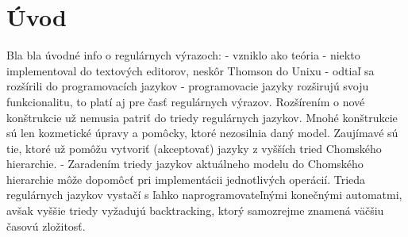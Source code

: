 {}
{}
\chapter*{Úvod}\label{chap:intro}

Bla bla úvodné info o regulárnych výrazoch:
- vzniklo ako teória
- niekto implementoval do textových editorov, neskôr Thomson do Unixu
- odtiaľ sa rozšírili do programovacích jazykov
- programovacie jazyky rozširujú svoju funkcionalitu, to platí aj pre časť regulárnych výrazov. Rozšírením o nové konštrukcie už nemusia patriť do triedy regulárnych jazykov. Mnohé konštrukcie sú len kozmetické úpravy a pomôcky, ktoré nezosilnia daný model. Zaujímavé sú tie, ktoré už pomôžu vytvoriť (akceptovať) jazyky z vyšších tried Chomského hierarchie.
- Zaradením triedy jazykov aktuálneho modelu do Chomského hierarchie môže dopomôcť pri implementácii jednotlivých operácií. Trieda regulárnych jazykov vystačí s ľahko naprogramovateľnými konečnými automatmi, avšak vyššie triedy vyžadujú backtracking, ktorý samozrejme znamená väčšiu časovú zložitosť.
